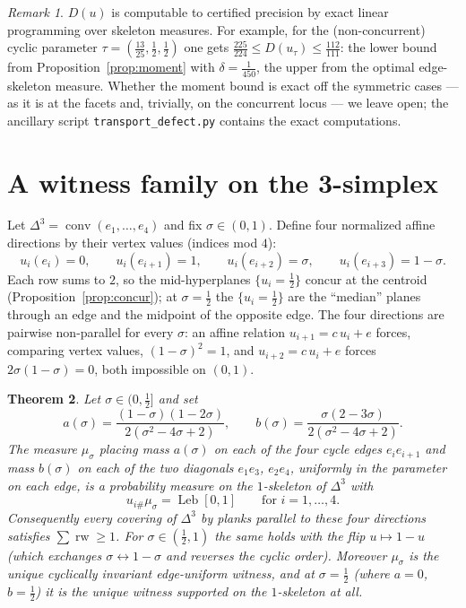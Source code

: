 \documentclass[11pt,reqno]{amsart}
\theoremstyle{plain}
\newtheorem{theorem}{Theorem}[section]
\theoremstyle{definition}
\theoremstyle{remark}
\newtheorem{remark}[theorem]{Remark}
\newcommand{\rw}{\operatorname{rw}}
\newcommand{\Leb}{\operatorname{Leb}}
\begin{document}
\begin{remark}\label{rem:sandwich}
$D(u)$ is computable to certified precision by exact linear programming over
skeleton measures. For example, for the (non-concurrent) cyclic parameter
$\tau=(\tfrac{13}{25},\tfrac12,\tfrac12)$ one gets
$\tfrac{225}{224}\le D(u_\tau)\le\tfrac{112}{111}$: the lower bound from
Proposition~\ref{prop:moment} with $\delta=\tfrac1{450}$, the upper from the
optimal edge-skeleton measure. Whether the moment bound is exact off the
symmetric cases --- as it is at the facets and, trivially, on the concurrent
locus --- we leave open; the ancillary script
\texttt{transport\_defect.py} contains the exact computations.
\end{remark}

\section{A witness family on the 3-simplex}\label{sec:simplex3}
Let $\Delta^3=\operatorname{conv}(e_1,\dots,e_4)$ and fix $\sigma\in(0,1)$.
Define four normalized affine directions by their vertex values (indices mod
$4$):
\begin{equation}\label{eq:sigma-family}
u_i(e_i)=0,\qquad u_i(e_{i+1})=1,\qquad u_i(e_{i+2})=\sigma,\qquad
u_i(e_{i+3})=1-\sigma .
\end{equation}
Each row sums to $2$, so the mid-hyperplanes $\{u_i=\tfrac12\}$ concur at the
centroid (Proposition~\ref{prop:concur}); at $\sigma=\tfrac12$ the
$\{u_i=\tfrac12\}$ are the ``median'' planes through an edge and the midpoint of
the opposite edge. The four directions are pairwise non-parallel for every
$\sigma$: an affine relation $u_{i+1}=c\,u_i+e$ forces, comparing vertex values,
$(1-\sigma)^2=1$, and $u_{i+2}=c\,u_i+e$ forces $2\sigma(1-\sigma)=0$, both
impossible on $(0,1)$.

\begin{theorem}\label{thm:simplex3}
Let $\sigma\in(0,\tfrac12]$ and set
\[
a(\sigma)=\frac{(1-\sigma)(1-2\sigma)}{2(\sigma^2-4\sigma+2)},\qquad
b(\sigma)=\frac{\sigma(2-3\sigma)}{2(\sigma^2-4\sigma+2)} .
\]
The measure $\mu_\sigma$ placing mass $a(\sigma)$ on each of the four cycle
edges $e_ie_{i+1}$ and mass $b(\sigma)$ on each of the two diagonals
$e_1e_3$, $e_2e_4$, uniformly in the parameter on each edge, is a probability
measure on the $1$-skeleton of $\Delta^3$ with
\[
u_{i\#}\mu_\sigma=\Leb[0,1]\qquad\text{for }i=1,\dots,4 .
\]
Consequently every covering of $\Delta^3$ by planks parallel to these four
directions satisfies $\sum\rw\ge1$. For $\sigma\in(\tfrac12,1)$ the same holds
with the flip $u\mapsto1-u$ (which exchanges $\sigma\leftrightarrow1-\sigma$ and
reverses the cyclic order). Moreover $\mu_\sigma$ is the unique cyclically
invariant edge-uniform witness, and at $\sigma=\tfrac12$ (where $a=0$,
$b=\tfrac12$) it is the unique witness supported on the $1$-skeleton at all.
\end{theorem}
\end{document}
